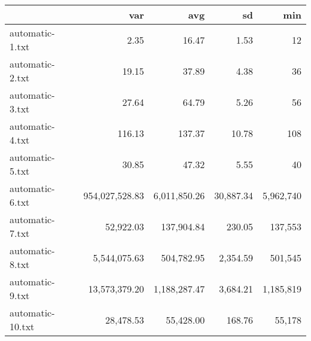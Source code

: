 \begin{tabular}{lrrrr}
  \toprule  & var & avg & sd & min \\ 
  \midrule automatic-1.txt & 2.35 & 16.47 & 1.53 & 12 \\ 
  automatic-2.txt & 19.15 & 37.89 & 4.38 & 36 \\ 
  automatic-3.txt & 27.64 & 64.79 & 5.26 & 56 \\ 
  automatic-4.txt & 116.13 & 137.37 & 10.78 & 108 \\ 
  automatic-5.txt & 30.85 & 47.32 & 5.55 & 40 \\ 
  automatic-6.txt & 954,027,528.83 & 6,011,850.26 & 30,887.34 & 5,962,740 \\ 
  automatic-7.txt & 52,922.03 & 137,904.84 & 230.05 & 137,553 \\ 
  automatic-8.txt & 5,544,075.63 & 504,782.95 & 2,354.59 & 501,545 \\ 
  automatic-9.txt & 13,573,379.20 & 1,188,287.47 & 3,684.21 & 1,185,819 \\ 
  automatic-10.txt & 28,478.53 & 55,428.00 & 168.76 & 55,178 \\ 
   \bottomrule \end{tabular}

